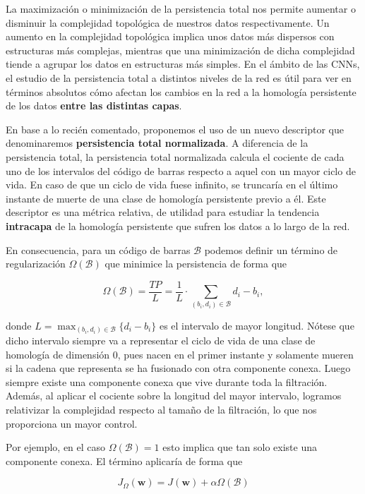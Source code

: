 La maximización o minimización de la persistencia total nos permite aumentar o disminuir la complejidad topológica de nuestros datos respectivamente. Un aumento en la complejidad topológica implica unos datos más dispersos con estructuras más complejas, mientras que una minimización de dicha complejidad tiende a agrupar los datos en estructuras más simples. En el ámbito de las CNNs, el estudio de la persistencia total a distintos niveles de la red es útil para ver en términos absolutos cómo afectan los cambios en la red a la homología persistente de los datos \textbf{entre las distintas capas}.

En base a lo recién comentado, proponemos el uso de un nuevo descriptor que denominaremos \textbf{persistencia total normalizada}. A diferencia de la persistencia total, la persistencia total normalizada calcula el cociente de cada uno de los intervalos del código de barras respecto a aquel con un mayor ciclo de vida. En caso de que un ciclo de vida fuese infinito, se truncaría en el último instante de muerte de una clase de homología persistente previo a él. Este descriptor es una métrica relativa, de utilidad para estudiar la tendencia \textbf{intracapa} de la homología persistente que sufren los datos a lo largo de la red.

En consecuencia, para un código de barras $\mathcal{B}$ podemos definir un término de regularización $\Omega(\mathcal{B})$ que minimice la persistencia de forma que

\[
\Omega(\mathcal{B}) = \frac{TP}{L} = \frac{1}{L} \cdot \sum_{(b_i,d_i) \in \mathcal{B}} d_i - b_i,
\]

donde $L = \max_{(b_i,d_i) \in \mathcal{B}}\{ d_i - b_i \}$ es el intervalo de mayor longitud. Nótese que dicho intervalo siempre va a representar el ciclo de vida de una clase de homología de dimensión 0, pues nacen en el primer instante y solamente mueren si la cadena que representa se ha fusionado con otra componente conexa. Luego siempre existe una componente conexa que vive durante toda la filtración. Además, al aplicar el cociente sobre la longitud del mayor intervalo, logramos relativizar la complejidad respecto al tamaño de la filtración, lo que nos proporciona un mayor control.

Por ejemplo, en el caso $\Omega(\mathcal{B}) = 1$ esto implica que tan solo existe una componente conexa. El término aplicaría de forma que

\[
J_{\Omega}(\mathbf{w}) = J(\mathbf{w}) + \alpha \Omega(\mathcal{B})
\]

